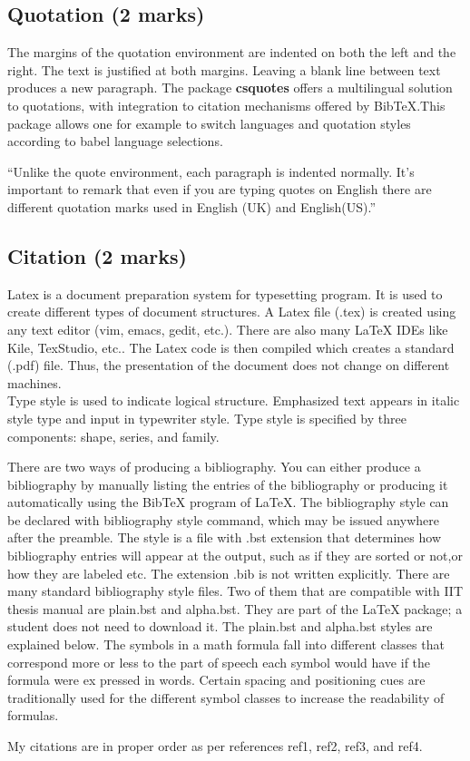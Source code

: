 \documentclass[a4paper,12pt]{article}
\begin{document}
\subsection{Quotation (2 marks)}
\noindent The margins of the quotation environment are indented on both the left and the right. The text is justified at both margins. Leaving a blank line between text produces a new paragraph. The package \textbf{csquotes} offers a multilingual solution to quotations, with integration to citation mechanisms offered by BibTeX.This package allows one for example to switch languages and quotation styles according to babel language selections.\\
\begin{displayquote}
\enquote{Unlike the quote environment, each paragraph is indented normally. It's important to remark that even if you are typing quotes on English there are different quotation marks used in English (UK) and English(US).}
\end{displayquote}
\subsection{Citation (2 marks)}
Latex \cite{ref1} is a document preparation system for typesetting program. It is used to create different types of document structures. A Latex file (.tex) is created using any text editor (vim, emacs, gedit, etc.).  There are also many LaTeX IDEs like Kile, TexStudio, etc.. The Latex code is then compiled which creates a standard (.pdf) file. Thus, the presentation of the document does not change on different machines.\\
Type style\cite{ref2} is used to indicate logical structure. Emphasized text appears in italic style type and input in typewriter style. Type style is specified by three components: shape, series, and family.\\
\par There are two ways of producing a bibliography\cite{ref3}. You can either produce a bibliography by manually listing the entries of the bibliography or producing it automatically using the BibTeX program of LaTeX. The bibliography style can be declared with bibliography style command, which may be issued anywhere after the preamble. The style is a file with .bst extension that determines how bibliography entries will appear at the output, such as if they are sorted or not,or how they are labeled etc. The extension .bib is not written explicitly. There are many standard bibliography style files. Two of them that are compatible with IIT thesis manual are plain.bst and alpha.bst. They are part of the LaTeX package; a student does not need to download it. The plain.bst and alpha.bst styles are explained below. The symbols in a math formula fall into different classes that correspond more or less to the part of speech each symbol would have if the formula were ex pressed in words. Certain spacing and positioning cues are traditionally used for the different symbol classes to increase the readability of formulas. \cite{ref4}
\par My citations are in proper order as per references ref1, ref2, ref3, and ref4.
\end{document}
